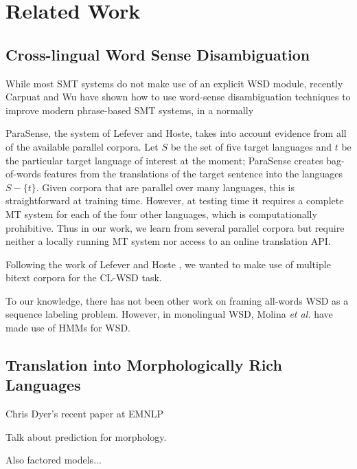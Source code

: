 \section{Related Work}

\subsection{Cross-lingual Word Sense Disambiguation}

While most SMT systems do not make use of an explicit WSD module, recently
Carpuat and Wu have shown how to use word-sense disambiguation techniques to
improve modern phrase-based SMT systems, in a normally 

\cite{carpuatpsd,carpuat-wu:2007:EMNLP-CoNLL2007,carpuat2008evaluation}


ParaSense, the system of Lefever
and Hoste, takes into account evidence from all of the available parallel
corpora. Let $S$ be the set of five target languages and $t$ be the particular
target language of interest at the moment; ParaSense creates bag-of-words
features from the translations of the target sentence into the languages $S -
\lbrace{t \rbrace}$.
Given corpora that are parallel over many languages, this is straightforward at
training time. However, at testing time it requires a complete MT system for
each of the four other languages, which is computationally prohibitive. Thus in
our work, we learn from several parallel corpora but require neither a locally
running MT system nor access to an online translation API.

Following the work of Lefever and Hoste
, we wanted to make use of
multiple bitext corpora for the CL-WSD task.

To our knowledge, there has not been other work on framing all-words WSD as a
sequence labeling problem. However, in monolingual WSD, Molina \textit{et al.}
have made use of HMMs for WSD. 


\subsection{Translation into Morphologically Rich Languages}

Chris Dyer's recent paper at EMNLP
\cite{chahuneau:2013:emnlp}

Talk about prediction for morphology.
\cite{toutanova-suzuki-ruopp:2008:ACLMain}

Also factored models...
\cite{yeniterzi-oflazer:2010:ACL}

